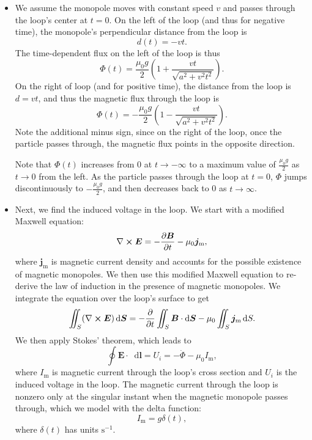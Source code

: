 \documentclass[11pt, a4paper]{article}
\newcommand{\diff}{\mathop{}\!\mathrm{d}} %
\renewcommand{\vec}[1]{\bm{#1}} %
\newcommand{\E}{\vec{E}}  %
\newcommand{\B}{\vec{B}}  %
\newcommand{\mm}{\mu_{0}}  %
\newcommand{\m}{\vec{m}}  %
\renewcommand{\curl}{\nabla \cross}
\begin{document}
\begin{itemize}
	\item We assume the monopole moves with constant speed $ v $ and passes through the loop's center at $ t = 0 $. On the left of the loop (and thus for negative time), the monopole's perpendicular distance from the loop is
	\begin{equation*}
		d(t) = - vt.
	\end{equation*}
	The time-dependent flux on the left of the loop is thus
	\begin{equation*}
		\Phi(t) = \frac{\mm g}{2}\left(1 + \frac{vt}{\sqrt{a^{2} +v^{2}t^{2}}}\right).
	\end{equation*}
	On the right of loop (and for positive time), the distance from the loop is $ d = vt $, and thus the magnetic flux through the loop is
	\begin{equation*}
		\Phi(t) = -\frac{\mm g}{2}\left(1 - \frac{vt}{\sqrt{a^{2} +v^{2}t^{2}}}\right).
	\end{equation*}
	Note the additional minus sign, since on the right of the loop, once the particle passes through, the magnetic flux points in the opposite direction.
	
	Note that $ \Phi(t) $ increases from $ 0 $ at $ t \to -\infty $ to a maximum value of $ \frac{\mm g}{2} $ as $ t \to 0 $ from the left. As the particle passes through the loop at $ t = 0 $, $ \Phi $ jumps discontinuously to $ - \frac{\mm g}{2}  $, and then decreases back to 0 as $ t \to \infty $. 
	
	\item Next, we find the induced voltage in the loop. We start with a modified Maxwell equation:
	\begin{equation*}
		\curl \E = - \pdv{\B}{t} - \mm \vec{j}_{\text{m}},
	\end{equation*}
	where $ \vec{j}_{\text{m}} $ is magnetic current density and accounts for the possible existence of magnetic monopoles. We then use this modified Maxwell equation to re-derive the law of induction in the presence of magnetic monopoles. We integrate the equation over the loop's surface to get
	\begin{equation*}
		\iint_{S} (\curl \E)\diff \vec{S} = - \pdv{t}\iint_{S} \B \cdot \diff \vec{S} - \mm \iint_{S} \vec{j}_{\text{m}}\diff S.
	\end{equation*}
	We then apply Stokes' theorem, which leads to
	\begin{equation*}
		\oint \E \cdot \diff \vec{l} = U_{i} = - \dot{\Phi} - \mm I_{\text{m}},
	\end{equation*}
	where $ I_{\text{m}} $ is magnetic current through the loop's cross section and $ U_{i} $ is the induced voltage in the loop. The magnetic current through the loop is nonzero only at the singular instant when the magnetic monopole passes through, which we model with the delta function:
	\begin{equation*}
		I_{\text{m}} = g \delta (t),
	\end{equation*}
	where $ \delta(t) $ has units $ \si{\second^{-1}} $. 
	

\end{itemize}
\end{document}
